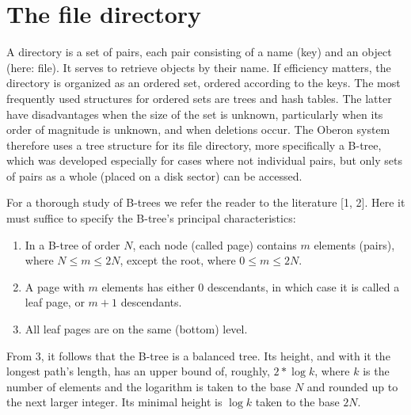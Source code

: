 \section{The file directory}
A directory is a set of pairs, each pair consisting of a name (key) and an object (here: file). It
serves to retrieve objects by their name. If efficiency matters, the directory is organized as an
ordered set, ordered according to the keys. The most frequently used structures for ordered sets
are trees and hash tables. The latter have disadvantages when the size of the set is unknown,
particularly when its order of magnitude is unknown, and when deletions occur. The Oberon
system therefore uses a tree structure for its file directory, more specifically a B-tree, which was
developed especially for cases where not individual pairs, but only sets of pairs as a whole
(placed on a disk sector) can be accessed.

For a thorough study of B-trees we refer the reader to the literature [1, 2]. Here it must suffice to
specify the B-tree's principal characteristics:
\begin{enumerate}
	\item In a B-tree of order $N$, each node (called page) contains $m$ elements (pairs), where $N \leq m \leq
2N$, except the root, where $0 \leq m \leq 2N$.
	\item A page with $m$ elements has either $0$ descendants, in which case it is called a leaf page, or $m + 1$ descendants.
	\item All leaf pages are on the same (bottom) level.
\end{enumerate}
From 3, it follows that the B-tree is a balanced tree. Its height, and with it the longest path's
length, has an upper bound of, roughly, $2 * \log{k}$, where $k$ is the number of elements and the
logarithm is taken to the base $N$ and rounded up to the next larger integer. Its minimal height is
$\log{k}$ taken to the base $2N$.

